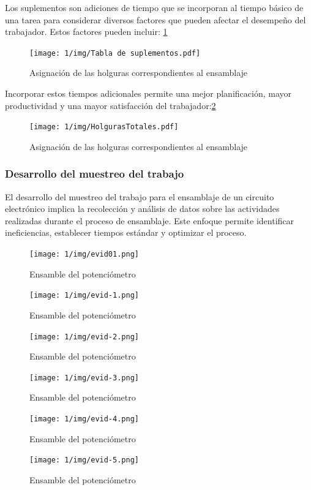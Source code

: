     Los suplementos son adiciones de tiempo que se incorporan al tiempo básico de una tarea para considerar diversos factores que pueden afectar el desempeño del trabajador. Estos factores pueden incluir:
    \ref{fig:Tabla de suplementos y hoguras}
     \begin{figure}[H]
            \centering
            \texttt{[image: 1/img/Tabla de suplementos.pdf]}
            \caption{Asignación de las holguras correspondientes al ensamblaje}
            \label{fig:Tabla de suplementos y hoguras}
        \end{figure}
    Incorporar estos tiempos adicionales permite una mejor planificación, mayor productividad y una mayor satisfacción del trabajador:\ref{fig:HolgurasTotales}
     \begin{figure}[H]
            \centering
            \texttt{[image: 1/img/HolgurasTotales.pdf]}
            \caption{Asignación de las holguras correspondientes al ensamblaje}
            \label{fig:HolgurasTotales}
        \end{figure}
    
    \subsubsection{Desarrollo del muestreo del trabajo}
    El desarrollo del muestreo del trabajo para el ensamblaje de un circuito electrónico implica la recolección y análisis de datos sobre las actividades realizadas durante el proceso de ensamblaje. Este enfoque permite identificar ineficiencias, establecer tiempos estándar y optimizar el proceso.
    
     \begin{figure}[H]
            \centering
            \texttt{[image: 1/img/evid01.png]}
            \caption{Ensamble del potenciómetro}
            \label{fig:evid01}
        \end{figure}
     \begin{figure}[H]
            \centering
            \texttt{[image: 1/img/evid-1.png]}
            \caption{Ensamble del potenciómetro}
            \label{fig:evid-1}
        \end{figure}
     \begin{figure}[H]
            \centering
            \texttt{[image: 1/img/evid-2.png]}
            \caption{Ensamble del potenciómetro}
            \label{fig:evid-2}
        \end{figure}
     \begin{figure}[H]
            \centering
            \texttt{[image: 1/img/evid-3.png]}
            \caption{Ensamble del potenciómetro}
            \label{fig:evid-3}
        \end{figure}
     \begin{figure}[H]
            \centering
            \texttt{[image: 1/img/evid-4.png]}
            \caption{Ensamble del potenciómetro}
            \label{fig:evid-4}
        \end{figure}
    \begin{figure}[H]
            \centering
            \texttt{[image: 1/img/evid-5.png]}
            \caption{Ensamble del potenciómetro}
            \label{fig:evid-5}
        \end{figure}
